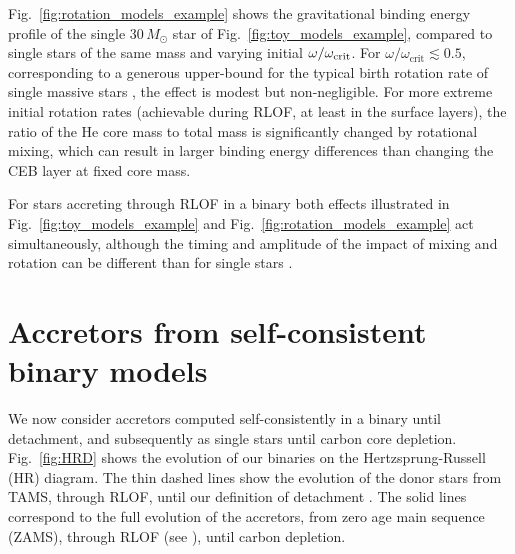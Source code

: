 \documentclass[twocolumn,twocolappendix,trackchanges]{aastex63}
\DeclareRobustCommand{\Figref}[1]{Fig.~\ref{#1}}
\begin{document}
\Figref{fig:rotation_models_example} shows the gravitational binding
energy profile of the single $30\,M_\odot$ star of
\Figref{fig:toy_models_example}, compared to single stars of the same
mass and varying initial $\omega/\omega_{\rm crit}$. %
For $\omega/\omega_\mathrm{crit}\lesssim 0.5$, corresponding to a
generous upper-bound for the typical birth rotation rate of single
massive stars \citep[e.g.,][]{ramirez-agudelo:2015}, the effect is
modest but non-negligible. For more extreme initial rotation rates
(achievable during RLOF, at least in the surface layers), the ratio of
the He core mass to total mass is significantly changed by rotational
mixing, which can result in larger binding energy differences than
changing the CEB layer at fixed core mass.


For stars accreting through RLOF in a binary both
effects illustrated in \Figref{fig:toy_models_example} and
\Figref{fig:rotation_models_example} act simultaneously, although the
timing and amplitude of the impact of mixing and rotation can be
different than for single stars \citep[e.g.,][]{renzo:2021zoph}.

\section{Accretors from self-consistent binary models}
\label{sec:bin_models}

We now consider accretors computed self-consistently in a binary until
detachment, and subsequently as single stars until carbon core
depletion. \Figref{fig:HRD} shows the evolution of our binaries on the
Hertzsprung-Russell (HR) diagram. The thin dashed lines %
show the evolution of the donor stars from TAMS,
through RLOF, until our definition of detachment \citep[see, e.g.,][]{yoon:2017,
  gotberg:2017, gotberg:2018, laplace:2020, laplace:2021}. The solid
lines correspond to the full evolution of the accretors, from zero age
main sequence (ZAMS), through RLOF (see \citealt{sravan:2019,
  renzo:2021zoph, wang:2020}), until carbon depletion. %
\end{document}
